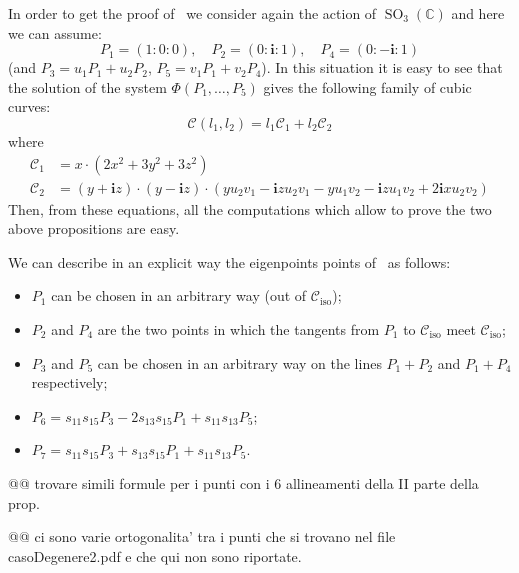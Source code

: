 \documentclass{amsart}
\theoremstyle{plain}
\theoremstyle{definition}
\newcommand{\C}{\mathbb{C}}
\newcommand{\iso}{\mathcal{C}_{\mathrm{iso}}}
\newcommand{\SO}{\operatorname{SO}}
\newcommand{\iii}{\textbf{i}}
\begin{document}
In order to get the proof of~
we consider again the action of $\SO_3(\C)$ and here we can assume:
\[
P_1 = (1: 0: 0), \quad P_2 = (0: \iii: 1), \quad P_4 = (0: -\iii: 1)
\]
(and $P_3 = u_1P_1+u_2P_2$, $P_5 = v_1P_1+v_2P_4$). In this situation it
is easy to see that the solution of the system $\Phi(P_1, \dots, P_5)$
gives the following family of cubic curves:
\[
\mathcal{C}(l_1, l_2) = l_1\mathcal{C}_1+l_2\mathcal{C}_2
\]
where
\begin{align*}
  \mathcal{C}_1 & = x \cdot \left(2x^{2} + 3 y^{2} + 3 z^{2}\right)\\
  \mathcal{C}_2 & = (y + \iii z) \cdot (y - \iii z)
\cdot (y u_{2} v_{1} - \iii z u_{2} v_{1} - y u_{1} v_{2} -
\iii z u_{1} v_{2} + 2 \iii x u_{2} v_{2})
\end{align*}
Then, from these equations, all the computations which allow to prove
the two above propositions are easy.

We can describe in an explicit way the eigenpoints points
of~ as follows:
\begin{itemize}
\item $P_1$ can be chosen in an arbitrary way (out of $\iso$);
\item $P_2$ and $P_4$ are the two points in which the
tangents from $P_1$ to $\iso$ meet $\iso$;
\item $P_3$ and $P_5$ can be chosen in an arbitrary way on the lines
$P_1+P_2$ and $P_1+P_4$ respectively;
\item $P_6 = s_{11}s_{15}P_3-2s_{13}s_{15}P_1 + s_{11}s_{13}P_5$;
\item $P_7 = s_{11}s_{15}P_3+s_{13}s_{15}P_1 + s_{11}s_{13}P_5$.
\end{itemize}
@@ trovare simili formule per i punti con i 6 allineamenti della
II parte della prop.

@@ ci sono varie ortogonalita' tra i punti che si trovano nel file
casoDegenere2.pdf e che qui non sono riportate.
\end{document}
